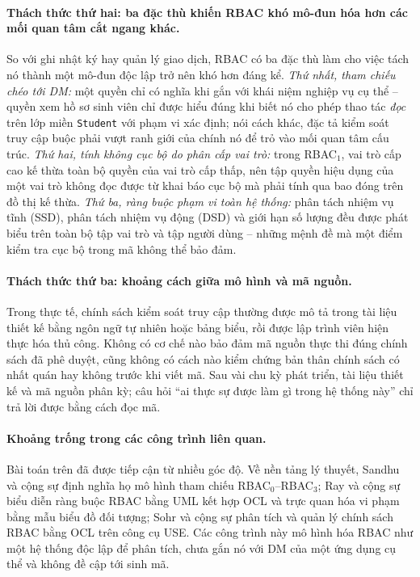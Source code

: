 \paragraph{Thách thức thứ hai: ba đặc thù khiến RBAC khó mô-đun hóa hơn các mối quan tâm cắt ngang khác.}
So với ghi nhật ký hay quản lý giao dịch, RBAC có ba đặc thù làm cho việc tách nó thành một mô-đun độc lập trở nên khó hơn đáng kể. \emph{Thứ nhất, tham chiếu chéo tới DM:} một quyền chỉ có nghĩa khi gắn với khái niệm nghiệp vụ cụ thể -- quyền xem hồ sơ sinh viên chỉ được hiểu đúng khi biết nó cho phép thao tác \emph{đọc} trên lớp miền \texttt{Student} với phạm vi xác định; nói cách khác, đặc tả kiểm soát truy cập buộc phải vượt ranh giới của chính nó để trỏ vào mối quan tâm cấu trúc. \emph{Thứ hai, tính không cục bộ do phân cấp vai trò:} trong RBAC$_1$, vai trò cấp cao kế thừa toàn bộ quyền của vai trò cấp thấp, nên tập quyền hiệu dụng của một vai trò không đọc được từ khai báo cục bộ mà phải tính qua bao đóng trên đồ thị kế thừa. \emph{Thứ ba, ràng buộc phạm vi toàn hệ thống:} phân tách nhiệm vụ tĩnh (SSD), phân tách nhiệm vụ động (DSD) và giới hạn số lượng đều được phát biểu trên toàn bộ tập vai trò và tập người dùng -- những mệnh đề mà một điểm kiểm tra cục bộ trong mã không thể bảo đảm.

\paragraph{Thách thức thứ ba: khoảng cách giữa mô hình và mã nguồn.}
Trong thực tế, chính sách kiểm soát truy cập thường được mô tả trong tài liệu thiết kế bằng ngôn ngữ tự nhiên hoặc bảng biểu, rồi được lập trình viên hiện thực hóa thủ công. Không có cơ chế nào bảo đảm mã nguồn thực thi đúng chính sách đã phê duyệt, cũng không có cách nào kiểm chứng bản thân chính sách có nhất quán hay không trước khi viết mã. Sau vài chu kỳ phát triển, tài liệu thiết kế và mã nguồn phân kỳ; câu hỏi ``ai thực sự được làm gì trong hệ thống này'' chỉ trả lời được bằng cách đọc mã.

\paragraph{Khoảng trống trong các công trình liên quan.}
Bài toán trên đã được tiếp cận từ nhiều góc độ. Về nền tảng lý thuyết, Sandhu và cộng sự \cite{sandhu1996} định nghĩa họ mô hình tham chiếu RBAC$_0$--RBAC$_3$; Ray và cộng sự \cite{ray2004} biểu diễn ràng buộc RBAC bằng UML kết hợp OCL và trực quan hóa vi phạm bằng mẫu biểu đồ đối tượng; Sohr và cộng sự \cite{sohr2008} phân tích và quản lý chính sách RBAC bằng OCL trên công cụ USE. Các công trình này mô hình hóa RBAC như một hệ thống độc lập để phân tích, chưa gắn nó với DM của một ứng dụng cụ thể và không đề cập tới sinh mã.

